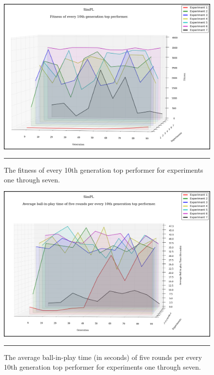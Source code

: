 \begin{figure}[ht!]  
  \centering
  \includegraphics[width=5in]{../Figures/Chapter3/all_10_tops.png}
  \rule{35em}{0.5pt}
  \caption[Top Performers Composite]{The fitness of every 10th generation top performer for experiments one through seven.}
  \label{fig:all_10_tops}
\end{figure}


\begin{figure}[ht!]  
  \centering
  \includegraphics[width=5in]{../Figures/Chapter3/all_10_tops_times.png}
  \rule{35em}{0.5pt}
  \caption[Top Performers Tournament Composite]{The average ball-in-play time (in seconds) of five rounds per every 10th generation top performer for experiments one through seven.}
  \label{fig:all_10_tops_times}
\end{figure}

